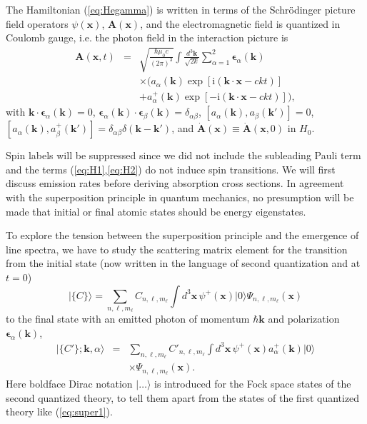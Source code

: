 \documentclass[final,3p,times,twocolumn]{elsarticle3}
\begin{document}
The Hamiltonian (\ref{eq:Hegamma}) is written in terms of the 
Schr\"o\-din\-ger picture field operators $\psi(\bm{x})$, $\bm{A}(\bm{x})$,
and the electromagnetic field is quantized in Coulomb gauge, i.e. the
photon field in the interaction picture is
\begin{eqnarray}\nonumber
\bm{A}(\bm{x},t)&=&\sqrt{\frac{\hbar\mu_0 c}{(2\pi)^3}}
\int\!\frac{d^3\bm{k}}{\sqrt{2k}}\sum_{\alpha=1}^2
\bm{\epsilon}_\alpha(\bm{k})
\\ \nonumber
&&\times\Big(
a_\alpha(\bm{k})
\exp[\mathrm{i}(\bm{k}\cdot\bm{x}-ckt)]
\\ \label{eq:Axt}
&&+a_{\alpha}^+(\bm{k})
\exp[-\mathrm{i}(\bm{k}\cdot\bm{x}-ckt)]\Big),
\end{eqnarray}
with $\bm{k}\cdot\bm{\epsilon}_\alpha(\bm{k})=0$,
$\bm{\epsilon}_\alpha(\bm{k})\cdot\bm{\epsilon}_\beta(\bm{k})=\delta_{\alpha\beta}$,
$[a_{\alpha}(\bm{k}),a_{\beta}(\bm{k}')]=0$, 
$[a_{\alpha}(\bm{k}),a_{\beta}^+(\bm{k}')]=\delta_{\alpha\beta}\delta(\bm{k}-\bm{k}')$,
and $\dot{\bm{A}}(\bm{x})\equiv\dot{\bm{A}}(\bm{x},0)$ in $H_0$.

Spin labels will be suppressed since we did not include the subleading Pauli term 
and the terms (\ref{eq:H1},\ref{eq:H2}) do not induce spin transitions.
We will first discuss emission rates before deriving absorption cross
sections. In agreement with the superposition principle in quantum mechanics,
no presumption will be made that initial or final atomic states should
be energy eigenstates.

To explore the tension between the superposition principle and the 
emergence of line spectra, we have to study the scattering matrix element for
the transition from the initial state (now written in the language of
second quantization and at $t=0$)
\begin{equation}\label{eq:lineinit}
\bm{|}\{C\}\bm{\rangle}=
\sum_{n,\ell,m_\ell}C_{n,\ell,m_\ell}\!\int\!d^3\bm{x}\,\psi^+(\bm{x})\bm{|}0\bm{\rangle}
\Psi_{n,\ell,m_\ell}(\bm{x})
\end{equation}
to the final state with an emitted photon of momentum $\hbar\bm{k}$
and polarization $\bm{\epsilon}_\alpha(\bm{k})$,
\begin{eqnarray}\nonumber
\bm{|}\{C'\};\bm{k},\alpha\bm{\rangle}&=&
\sum_{n,\ell,m_\ell}\!C'_{n,\ell,m_\ell}\!
\int\!d^3\bm{x}\,\psi^+(\bm{x})a^+_\alpha(\bm{k})\bm{|}0\bm{\rangle}
\\ \label{eq:linefinal}
&&\times
\Psi_{n,\ell,m_\ell}(\bm{x}).
\end{eqnarray}
Here boldface Dirac notation $\bm{|}\ldots\bm{\rangle}$ is introduced for 
the Fock space states of the second quantized theory, to tell them apart from
the states of the first quantized theory like (\ref{eq:super1}). 
\end{document}
